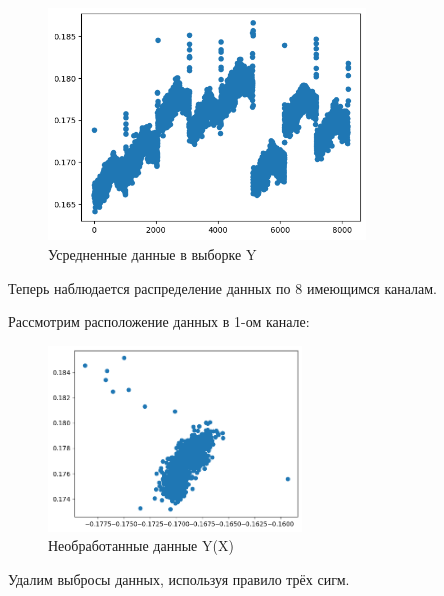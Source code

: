 \documentclass{article}
\begin{document}
  \begin{figure}[htbp!]
  \begin{center}
      \includegraphics[width = 0.75\textwidth]{y_scatter_middle}
      \caption{Усредненные данные в выборке Y}
  \label{figure:y_scatter_middle}
  \end{center}
  \end{figure}


  \newpage

  Теперь наблюдается распределение данных по 8 имеющимся каналам.

  Рассмотрим расположение данных в 1-ом канале:

  \begin{figure}[htbp!]
    \begin{center}
        \includegraphics[width = 0.6\textwidth]{first_channel}
        \caption{Необработанные данные Y(X)}
    \label{figure:first_channel}
    \end{center}
    \end{figure}

  Удалим выбросы данных, используя правило трёх сигм.
\end{document}
